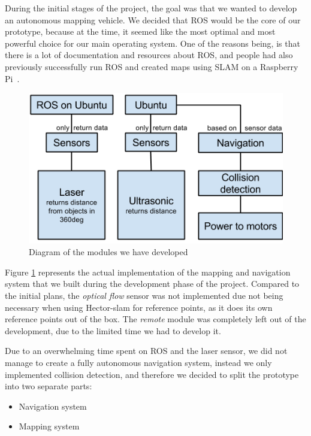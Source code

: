 During the initial stages of the project, the goal was that we wanted to develop an autonomous mapping vehicle. We decided that ROS would be the core of our prototype, because at the time, it seemed like the most optimal and most powerful choice for our main operating system. One of the reasons being, is that there is a lot of documentation and resources about ROS, and people had also previously successfully run ROS and created maps using SLAM on a Raspberry Pi~\cite{pibot}\cite{pibotbook}.

\begin{figure}[H]
	\centering
	\includegraphics[scale=.7]{images/developmentdiagram2.png}
	\caption{Diagram of the modules we have developed}
	\label{fig:developmentdiagram2}
\end{figure}

Figure \ref{fig:developmentdiagram2} represents the actual implementation of the mapping and navigation system that we built during the development phase of the project. Compared to the initial plans, the \textit{optical flow} sensor was not implemented due not being necessary when using Hector-slam for reference points, as it does its own reference points out of the box. The \textit{remote} module was completely left out of the development, due to the limited time we had to develop it.

Due to an overwhelming time spent on ROS and the laser sensor, we did not manage to create a fully autonomous navigation system, instead we only implemented collision detection, and therefore we decided to split the prototype into two separate parts: 
\begin{itemize}
	\item Navigation system
	\item Mapping system
\end{itemize}

